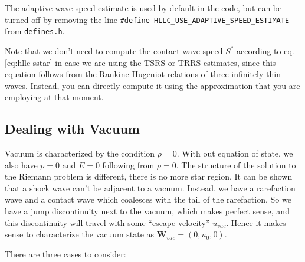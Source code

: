 The adaptive wave speed estimate is used by default in the code, but can be turned off by removing the line \verb|#define HLLC_USE_ADAPTIVE_SPEED_ESTIMATE| from \texttt{defines.h}.

Note that we don't need to compute the contact wave speed $S^*$ according to eq. \ref{eq:hllc-sstar} in case we are using the TSRS or TRRS estimates, since this equation follows from the Rankine Hugeniot relations of three infinitely thin waves.
Instead, you can directly compute it using the approximation that you are employing at that moment.










\subsection{Dealing with Vacuum}


Vacuum is characterized by the condition $\rho = 0$.
With out equation of state, we also have $p = 0$ and $E = 0$ following from $\rho = 0$.
The structure of the solution to the Riemann problem is different, there is no more star region.
It can be shown that a shock wave can't be adjacent to a vacuum.
Instead, we have a rarefaction wave and a contact wave which coalesces with the tail of the rarefaction.
So we have a jump discontinuity next to the vacuum, which makes perfect sense, and this discontinuity will travel with some ``escape velocity'' $u_{vac}$.
Hence it makes sense to characterize the vacuum state as $\mathbf{W}_{vac} = (0, u_0, 0)$.

There are three cases to consider:


